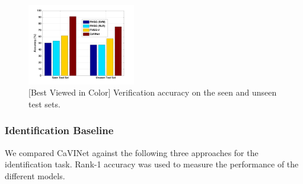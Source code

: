 \begin{figure}[h]
\centering
\includegraphics[width=0.42\textwidth]{images/ver-base.png}
\caption{[Best Viewed in Color] Verification accuracy on the seen and unseen test sets.}
\label{fig:verification_baseline}
\end{figure}

\subsubsection{Identification Baseline}
We compared CaVINet against the following three approaches for the identification task. Rank-1 accuracy was used to measure the performance of the different models.
